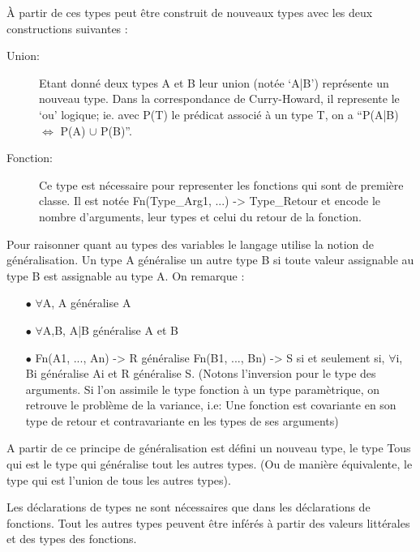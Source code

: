 \hfill\break
À partir de ces types peut être construit de nouveaux types
avec les deux constructions suivantes :
\begin{description}
   \item[Union:] Etant donné deux types A et B leur union (notée `A|B')
      représente un nouveau type. Dans la correspondance de Curry-Howard,
      il represente le `ou' logique; ie. avec P(T) le prédicat associé à
      un type T, on a ``P(A|B) $\iff$ P(A) $\cup$ P(B)''.
   \item[Fonction:] Ce type est nécessaire pour representer les fonctions
      qui sont de première classe. Il est notée Fn(Type\_Arg1, ...) -> Type\_Retour
      et encode le nombre d'arguments, leur types et celui du retour de la fonction.
\end{description}

\hfill\break
Pour raisonner quant au types des variables le langage utilise la 
notion de généralisation. Un type A généralise un autre type B si
toute valeur assignable au type B est assignable au type A.
On remarque :
\begin{itemize}
   \item[$\bullet$] $\forall$A, A généralise A
   \item[$\bullet$] $\forall$A,B, A|B généralise A et B
   \item[$\bullet$] Fn(A1, ..., An) -> R généralise Fn(B1, ..., Bn) -> S
      si et seulement si, $\forall$i, Bi généralise Ai et R généralise S.
      (Notons l'inversion pour le type des arguments. Si l'on assimile le
      type fonction à un type paramètrique, on retrouve le problème de la variance,
      i.e: Une fonction est covariante en son type de retour et contravariante en 
      les types de ses arguments)
\end{itemize}

\hfill\break
A partir de ce principe de généralisation est défini un nouveau type, le type Tous
qui est le type qui généralise tout les autres types. (Ou de manière équivalente, 
le type qui est l'union de tous les autres types).

\hfill\break
Les déclarations de types ne sont nécessaires que dans les déclarations de fonctions.
Tout les autres types peuvent être inférés à partir des valeurs littérales et des
types des fonctions.

